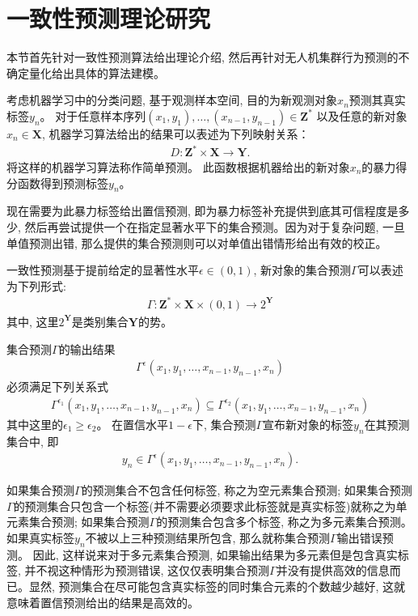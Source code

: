 \section{一致性预测理论研究}
本节首先针对一致性预测算法给出理论介绍, 然后再针对无人机集群行为预测的不确定量化给出具体的算法建模。

考虑机器学习中的分类问题, 基于观测样本空间, 目的为新观测对象$x_{n}$预测其真实标签$y_{n}$。 对于任意样本序列$(x_{1}, y_{1}), \ldots, (x_{n-1}, y_{n-1}) \in \mathbf{Z}^{*}$ 以及任意的新对象$x_{n} \in \mathbf{X}$, 机器学习算法给出的结果可以表述为下列映射关系：
\begin{align}
\label{simple-prediction}
D: \mathbf{Z}^{*} \times \mathbf{X} \rightarrow \mathbf{Y}.
\end{align}
将这样的机器学习算法称作简单预测。 此函数根据机器给出的新对象$x_{n}$的暴力得分函数得到预测标签$y_{n}$。

现在需要为此暴力标签给出置信预测, 即为暴力标签补充提供到底其可信程度是多少, 然后再尝试提供一个在指定显著水平下的集合预测。因为对于复杂问题, 一旦单值预测出错, 那么提供的集合预测则可以对单值出错情形给出有效的校正。

一致性预测基于提前给定的显著性水平$\epsilon \in (0, 1)$, 新对象的集合预测$\Gamma$可以表述为下列形式:
\begin{align}
\label{confidence-predictor}
\Gamma: \mathbf{Z}^{*} \times \mathbf{X} \times (0, 1) \rightarrow 2^{\mathbf{Y}}
\end{align}
其中, 这里$2^{\mathbf{Y}}$是类别集合$\mathbf{Y}$的势。

集合预测$\Gamma$的输出结果
\begin{align}
\label{confidence-output}
\Gamma^{\epsilon}(x_{1}, y_{1}, \ldots, x_{n-1}, y_{n-1}, x_{n})
\end{align}
必须满足下列关系式
\begin{align}
\Gamma^{\epsilon_{1}}(x_{1}, y_{1}, \ldots, x_{n-1}, y_{n-1}, x_{n}) \subseteq \Gamma^{\epsilon_{2}}(x_{1}, y_{1}, \ldots, x_{n-1}, y_{n-1}, x_{n})
\end{align}
其中这里的$\epsilon_{1} \geq \epsilon_{2}$。 在置信水平$1 - \epsilon$下, 集合预测$\Gamma$宣布新对象的标签$y_{n}$在其预测集合中, 即
\begin{align}
\label{confidence-y}
y_{n} \in \Gamma^{\epsilon}(x_{1}, y_{1}, \ldots, x_{n-1}, y_{n-1}, x_{n}).
\end{align}

如果集合预测$\Gamma$的预测集合不包含任何标签, 称之为空元素集合预测; 如果集合预测$\Gamma$的预测集合只包含一个标签(并不需要必须要求此标签就是真实标签)就称之为单元素集合预测; 如果集合预测$\Gamma$的预测集合包含多个标签, 称之为多元素集合预测。 如果真实标签$y_{n}$不被以上三种预测结果所包含, 那么就称集合预测$\Gamma$输出错误预测。 因此, 这样说来对于多元素集合预测, 如果输出结果为多元素但是包含真实标签, 并不视这种情形为预测错误, 这仅仅表明集合预测$\Gamma$并没有提供高效的信息而已。显然, 预测集合在尽可能包含真实标签的同时集合元素的个数越少越好, 这就意味着置信预测给出的结果是高效的。

